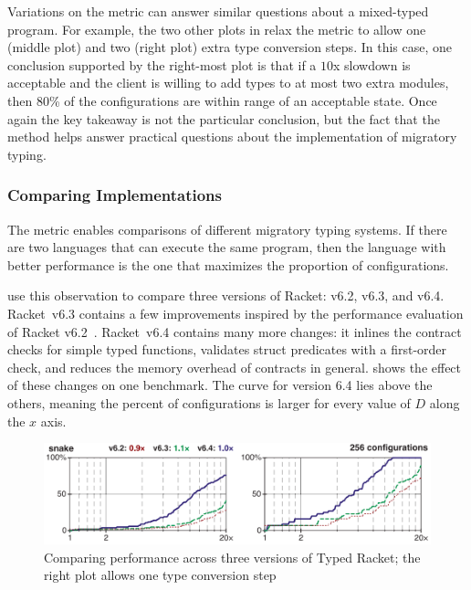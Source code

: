 Variations on the  metric can answer similar questions
 about a mixed-typed program.
For example, the two other plots in 
 relax the metric to allow one (middle plot) and two (right plot) extra type
 conversion steps.
In this case, one conclusion supported by the right-most plot is that
 if a $10$x slowdown is acceptable and the client is willing to add types
 to at most two extra modules, then 80\% of the configurations are within
 range of an acceptable state.
Once again the key takeaway is not the particular conclusion,
 but the fact that the method helps answer practical questions
 about the implementation of migratory typing.


\subsubsection{Comparing Implementations}

The  metric enables comparisons of different migratory
 typing systems.
If there are two languages that can execute the same program,
 then the language with better performance is the one that maximizes the
 proportion of  configurations.

\citet{gtnffvf-jfp-2019} use this observation to compare three versions
 of Racket: v6.2, v6.3, and v6.4.
Racket~v6.3 contains a few improvements inspired by the performance
 evaluation of Racket v6.2~\cite{tfgnvf-popl-2016}.
Racket~v6.4 contains many more changes:
 it inlines the contract checks for simple typed functions,
 validates struct predicates with a first-order check,
 and reduces the memory overhead of contracts in general.
 shows the effect of these changes on one benchmark.
The curve for version 6.4 lies above the others, meaning the percent of
  configurations is larger for every value of $D$ along
 the $x$ axis.

\begin{figure}[ht]
\includegraphics[width=0.8\columnwidth]{src/snake-jfp.png}
\caption{Comparing performance across three versions of Typed Racket; the right plot allows one type conversion step}
\label{fig:snake-jfp}
\end{figure}

